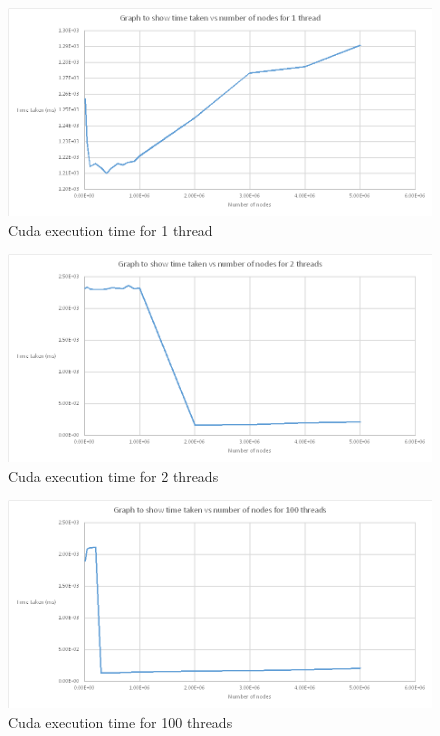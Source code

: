 \documentclass[a4paper]{article}
\begin{document}
\begin{figure}[H]
	\centering
	\includegraphics[width=1.0\textwidth,scale=1.0]{images/cuda_1thread}
	\caption{Cuda execution time for 1 thread}
\end{figure}

\begin{figure}[H]
	\centering
	\includegraphics[width=1.0\textwidth,scale=1.0]{images/cuda_2threads}
	\caption{Cuda execution time for 2 threads}
\end{figure}

\begin{figure}[H]
	\centering
	\includegraphics[width=1.0\textwidth,scale=1.0]{images/cuda_100threads}
	\caption{Cuda execution time for 100 threads}
\end{figure}
\end{document}
